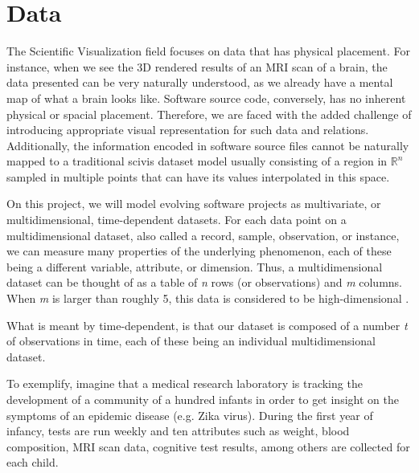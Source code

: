 
\section{Data}
The Scientific Visualization field focuses on data that has physical placement. For instance, when we see the 3D rendered results of an MRI scan of a brain, the data presented can be very naturally understood, as we already have a mental map of what a brain looks like. Software source code, conversely, has no inherent physical or spacial placement. Therefore, we are faced with the added challenge of introducing appropriate visual representation for such data and relations. Additionally, the information encoded in software source files cannot be naturally mapped to a traditional scivis dataset model usually consisting of a region in $\mathbb{R}^{n}$ sampled in multiple points that can have its values interpolated in this space.

On this project, we will model evolving software projects as multivariate, or multidimensional, time-dependent datasets. For each data point on a multidimensional dataset, also called a record, sample, observation, or instance, we can measure many properties of the underlying phenomenon, each of these being a different variable, attribute, or dimension. Thus, a multidimensional dataset can be thought of as a table of \textit{n} rows (or observations) and \textit{m} columns. When \textit{m} is larger than roughly 5, this data is considered to be high-dimensional .

What is meant by time-dependent, is that our dataset is composed of a number \textit{t} of observations in time, each of these being an individual multidimensional dataset.

To exemplify, imagine that a medical research laboratory is tracking the development of a community of a hundred infants in order to get insight on the symptoms of an epidemic disease (e.g. Zika virus). During the first year of infancy, tests are run weekly and ten attributes such as weight, blood composition, MRI scan data, cognitive test results, among others are collected for each child.

